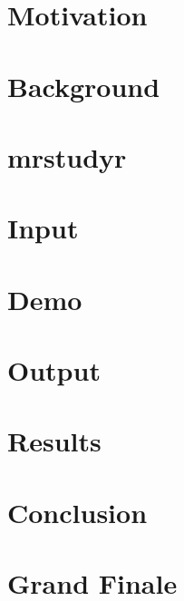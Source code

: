 \documentclass[hyperref]{beamer}
\title{\fontsize{50}{50}\selectfont{mrstudyr}}
\subtitle{Retrospective Mutant Reduction}
\author[McCurdy]{Colton J. McCurdy\\
{\small \href{https://twitter.com/McCurdyColton}{\textcolor{solarizedOrange}{\fontsize{15}{30}{\faTwitter}\small McCurdyColton}}}}
\institute[ICSME 2016]{ICSME 2016}
\date[September 23, 2016]{October 6, 2016}
\begin{document}
\begin{frame}
  \titlepage
\end{frame}

\section{Motivation}


\section{Background}


\section{mrstudyr}


\section{Input}


\section{Demo}


\section{Output}


\section{Results}


\section{Conclusion}


% 

\section{Grand Finale}

\end{document}

